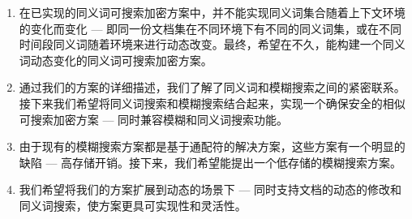 \begin{enumerate}
  \item
  在已实现的同义词可搜索加密方案中，并不能实现同义词集合随着上下文环境的变化而变化 --- 即同一份文档集在不同环境下有不同的同义词集，或在不同时间段同义词随着环境来进行动态改变。最终，希望在不久，能构建一个同义词动态变化的同义词可搜索加密方案。

  \item
  通过我们的方案的详细描述，我们了解了同义词和模糊搜索之间的紧密联系。接下来我们希望将同义词搜索和模糊搜索结合起来，实现一个确保安全的相似可搜索加密方案 --- 同时兼容模糊和同义词搜索功能。

  \item
  由于现有的模糊搜索方案都是基于通配符的解决方案，这些方案有一个明显的缺陷 --- 高存储开销。接下来，我们希望能提出一个低存储的模糊搜索方案。

  \item
  我们希望将我们的方案扩展到动态的场景下 --- 同时支持文档的动态的修改和同义词搜索，使方案更具可实现性和灵活性。
\end{enumerate}


